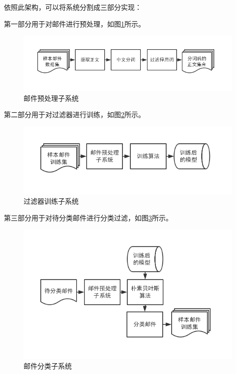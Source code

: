 \documentclass[UTF8,zihao=-4]{ctexart}
\begin{document}
	依照此架构，可以将系统分割成三部分实现：
	
	第一部分用于对邮件进行预处理，如图\ref{fig:preprocess-system}所示。
	\begin{figure}[ht]
		\centering
		\setlength{\abovecaptionskip}{0.cm}
		\setlength{\belowcaptionskip}{-0.cm}
		\includegraphics[scale=0.5]{pictures/邮件预处理子系统.png}
		\caption{邮件预处理子系统}
		\label{fig:preprocess-system}
	\end{figure}
	
	第二部分用于对过滤器进行训练，如图\ref{fig:train-system}所示。
	\begin{figure}[ht]
		\centering
		\setlength{\abovecaptionskip}{0.cm}
		\setlength{\belowcaptionskip}{-0.cm}
		\includegraphics[scale=0.5]{pictures/邮件训练子系统.png}
		\caption{过滤器训练子系统}
		\label{fig:train-system}
	\end{figure}
		
	第三部分用于对待分类邮件进行分类过滤，如图\ref{fig:predict-system}所示。
	\begin{figure}[!ht]
		\centering
		\setlength{\abovecaptionskip}{0.cm}
		\setlength{\belowcaptionskip}{-0.cm}	
		\includegraphics[scale=0.5]{pictures/邮件分类子系统.png}
		\caption{邮件分类子系统}
		\label{fig:predict-system}
	\end{figure}
\end{document}
